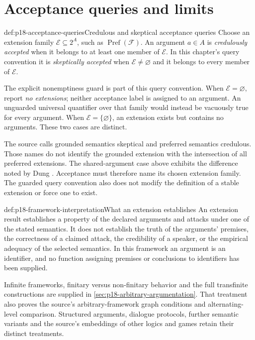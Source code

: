 \section{Acceptance queries and limits}
\label{sec:p18-acceptance-boundary}

\begin{hbdefinition}{def:p18-acceptance-queries}{Credulous and skeptical acceptance queries}
Choose an extension family \(\mathcal E\subseteq2^A\), such as
\(\operatorname{Pref}(\mathcal F)\). An argument \(a\in A\) is
\emph{credulously accepted} when it belongs to at least one member of
\(\mathcal E\). In this chapter's query convention it is
\emph{skeptically accepted} when \(\mathcal E\ne\varnothing\) and
it belongs to every member of \(\mathcal E\).

The explicit nonemptiness guard is part of this query convention. When
\(\mathcal E=\varnothing\), report \emph{no extensions}; neither
acceptance label is assigned to an argument. An unguarded universal
quantifier over that family would instead be vacuously true for every
argument. When \(\mathcal E=\{\varnothing\}\), an extension exists
but contains no arguments. These two cases are distinct.
\end{hbdefinition}

The source calls grounded semantics skeptical and preferred semantics
credulous. Those names do not identify the grounded extension with the
intersection of all preferred extensions. The shared-argument case above
exhibits the difference noted by Dung
\cite[remark~26, p.~330]{Dung1995}. Acceptance must therefore name its chosen
extension family. The guarded query convention also does not modify the
definition of a stable extension or force one to exist.

\begin{hbwarning}{def:p18-framework-interpretation}{What an extension establishes}
An extension result establishes a property of the declared arguments and
attacks under one of the stated semantics. It does not establish the truth
of the arguments' premises, the correctness of a claimed attack, the
credibility of a speaker, or the empirical adequacy of the selected semantics.
In this framework an argument is an identifier, and no function assigning
premises or conclusions to identifiers has been supplied.

Infinite frameworks, finitary versus non-finitary behavior and the full
transfinite constructions are supplied in
\cref{sec:p18-arbitrary-argumentation}. That treatment also proves the
source's arbitrary-framework graph conditions and alternating-level
comparison. Structured arguments, dialogue protocols, further semantic
variants and the source's embeddings of other logics and games retain
their distinct treatments.
\end{hbwarning}
